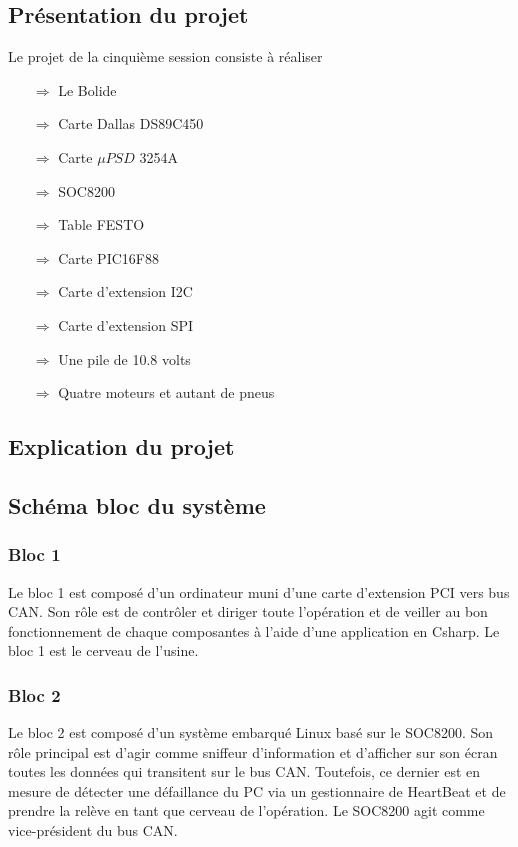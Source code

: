 \documentclass[10pt,a4paper,final]{article}
\begin{document}
\renewcommand\footrulewidth{1pt}
\fancyfoot[R]{\today}
\begin{spacing}{1.5}

\section{Présentation du projet}
Le projet de la cinquième session consiste à réaliser
\begin{itemize}
\item[$\Rightarrow$] Le Bolide
\item[$\Rightarrow$] Carte Dallas DS89C450
\item[$\Rightarrow$] Carte $\mu PSD$ 3254A
\item[$\Rightarrow$] SOC8200
\item[$\Rightarrow$] Table FESTO
\item[$\Rightarrow$] Carte PIC16F88
\item[$\Rightarrow$] Carte d'extension I{\small 2}C
\item[$\Rightarrow$] Carte d'extension SPI
\item[$\Rightarrow$] Une pile de 10.8 volts
\item[$\Rightarrow$] Quatre moteurs et autant de pneus
\end{itemize}

\subsection{Explication du projet}

\subsection{Schéma bloc du système}
\subsubsection{Bloc 1}
Le bloc 1 est composé d'un ordinateur muni d'une carte d'extension PCI vers bus CAN. Son rôle est de contrôler et diriger toute l'opération et de veiller au bon fonctionnement de chaque composantes à l'aide d'une application en Csharp. Le bloc 1 est le cerveau de l'usine.
 
\subsubsection{Bloc 2}
Le bloc 2 est composé d'un système embarqué Linux basé sur le SOC8200. Son rôle principal est d'agir comme sniffeur d'information et d'afficher sur son écran toutes les données qui transitent sur le bus CAN. Toutefois, ce dernier est en mesure de détecter une défaillance du PC via un gestionnaire de HeartBeat et de prendre la relève en tant que cerveau de l'opération. Le SOC8200 agit comme vice-président du bus CAN.


\end{spacing}
\end{document}

